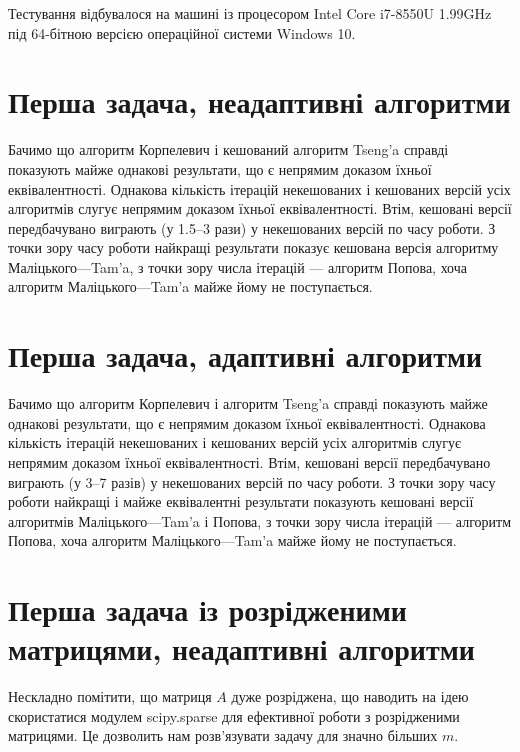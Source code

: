 Тестування відбувалося на машині із процесором Intel Core i7-8550U 1.99GHz під 64-бітною версією операційної системи Windows 10.

\section{Перша задача, неадаптивні алгоритми}



Бачимо що алгоритм Корпелевич і кешований алгоритм Tseng'a справді показують майже однакові результати, що є непрямим доказом їхньої еквівалентності. Однакова кількість ітерацій некешованих і кешованих версій усіх алгоритмів слугує непрямим доказом їхньої еквівалентності. Втім, кешовані версії передбачувано виграють (у 1.5--3 рази) у некешованих версій по часу роботи. З точки зору часу роботи найкращі результати показує кешована версія алгоритму Маліцького---Tam'a, з точки зору числа ітерацій --- алгоритм Попова, хоча алгоритм Маліцького---Tam'a майже йому не поступається.

\section{Перша задача, адаптивні алгоритми}



Бачимо що алгоритм Корпелевич і алгоритм Tseng'a справді показують майже однакові результати, що є непрямим доказом їхньої еквівалентності. Однакова кількість ітерацій некешованих і кешованих версій усіх алгоритмів слугує непрямим доказом їхньої еквівалентності. Втім, кешовані версії передбачувано виграють (у 3--7 разів) у некешованих версій по часу роботи. З точки зору часу роботи найкращі і майже еквівалентні результати показують кешовані версії алгоритмів Маліцького---Tam'a і Попова, з точки зору числа ітерацій --- алгоритм Попова, хоча алгоритм Маліцького---Tam'a майже йому не поступається.

\section{Перша задача із розрідженими матрицями, неадаптивні алгоритми}

Нескладно помітити, що матриця $A$ дуже розріджена, що наводить на ідею скористатися модулем scipy.sparse для ефективної роботи з розрідженими матрицями. Це дозволить нам розв'язувати задачу для значно більших $m$.



